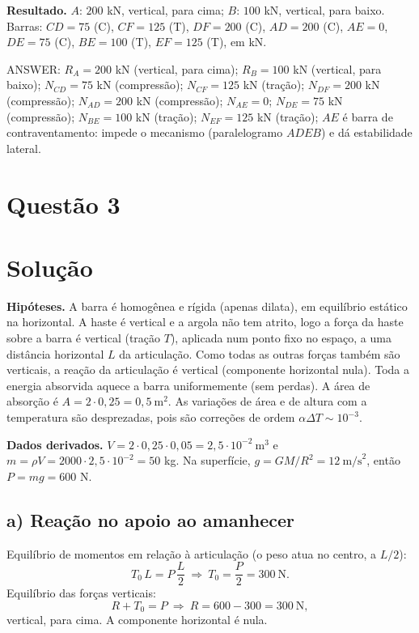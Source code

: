 \documentclass{article}%
\begin{document}
\textbf{Resultado.} $A$: $200$ kN, vertical, para cima; $B$: $100$ kN, vertical, para baixo. Barras: $CD=75$ (C), $CF=125$ (T), $DF=200$ (C), $AD=200$ (C), $AE=0$, $DE=75$ (C), $BE=100$ (T), $EF=125$ (T), em kN.

ANSWER: $R_A=200$ kN (vertical, para cima); $R_B=100$ kN (vertical, para baixo); $N_{CD}=75$ kN (compressão); $N_{CF}=125$ kN (tração); $N_{DF}=200$ kN (compressão); $N_{AD}=200$ kN (compressão); $N_{AE}=0$; $N_{DE}=75$ kN (compressão); $N_{BE}=100$ kN (tração); $N_{EF}=125$ kN (tração); $AE$ é barra de contraventamento: impede o mecanismo (paralelogramo $ADEB$) e dá estabilidade lateral.%
\newpage%
\section*{Questão 3}

\section*{Solução}

\textbf{Hipóteses.} A barra é homogênea e rígida (apenas dilata), em equilíbrio estático na horizontal. A haste é vertical e a argola não tem atrito, logo a força da haste sobre a barra é vertical (tração $T$), aplicada num ponto fixo no espaço, a uma distância horizontal $L$ da articulação. Como todas as outras forças também são verticais, a reação da articulação é vertical (componente horizontal nula). Toda a energia absorvida aquece a barra uniformemente (sem perdas). A área de absorção é $A=2\cdot 0{,}25=0{,}5\ \text{m}^2$. As variações de área e de altura com a temperatura são desprezadas, pois são correções de ordem $\alpha\Delta T\sim 10^{-3}$.

\textbf{Dados derivados.} $V=2\cdot0{,}25\cdot0{,}05=2{,}5\cdot10^{-2}\ \text{m}^3$ e $m=\rho V=2000\cdot 2{,}5\cdot10^{-2}=50$ kg. Na superfície, $g=GM/R^2=12\ \text{m/s}^2$, então $P=mg=600$ N.

\subsection*{a) Reação no apoio ao amanhecer}
Equilíbrio de momentos em relação à articulação (o peso atua no centro, a $L/2$):
\[
T_0\,L = P\,\frac{L}{2}\ \Rightarrow\ T_0=\frac{P}{2}=300\ \text{N}.
\]
Equilíbrio das forças verticais:
\[
R+T_0=P\ \Rightarrow\ R=600-300=300\ \text{N},
\]
vertical, para cima. A componente horizontal é nula.
\end{document}
